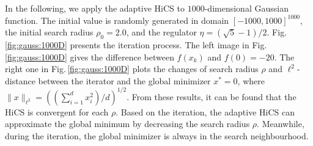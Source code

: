 \documentclass[mathpazo]{csam}
\theoremstyle{remark}
\begin{document}
In the following, we apply the adaptive HiCS to $1000$-dimensional
Gaussian function. The initial value is randomly generated in
domain $[-1000,1000]^{1000}$, the initial search radius $\rho_0 = 2.0$,
and the regulator $\eta=(\sqrt{5}-1)/2$. 
Fig.\,\ref{fig:gauss:1000D} presents the iteration process.
The left image in Fig.\,\ref{fig:gauss:1000D} gives
the difference between $f(x_k)$ and $f(0)=-20$. 
The right one in Fig.\,\ref{fig:gauss:1000D} 
plots the changes of search radius $\rho$ and $\ell^2$-distance between
the iterator and the global minimizer $x^*=0$, where $\|x\|_{\ell^2}=\left(
(\sum_{i=1}^d x_i^2) / d\right)^{1/2}$.
From these results, it can be found that the HiCS is convergent
for each $\rho$. Based on the iteration, the adaptive HiCS 
can approximate the global minimum by decreasing the search radius $\rho$. 
Meanwhile, during the iteration, the global minimizer is always in the
search neighbourhood. 
\end{document}
